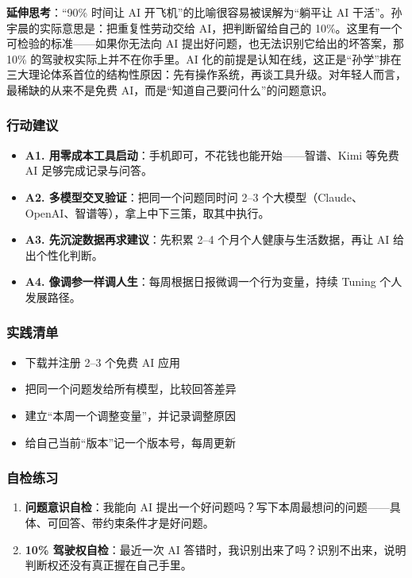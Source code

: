 \textbf{延伸思考}：``90\% 时间让 AI 开飞机''的比喻很容易被误解为``躺平让
AI 干活''。孙宇晨的实际意思是：把重复性劳动交给 AI，把判断留给自己的
10\%。这里有一个可检验的标准------如果你无法向 AI
提出好问题，也无法识别它给出的坏答案，那 10\%
的驾驶权实际上并不在你手里。AI
化的前提是认知在线，这正是``孙学''排在三大理论体系首位的结构性原因：先有操作系统，再谈工具升级。对年轻人而言，最稀缺的从来不是免费
AI，而是``知道自己要问什么''的问题意识。

\subsubsection{行动建议}

\begin{itemize}
\tightlist
\item
  \textbf{A1.
  用零成本工具启动}：手机即可，不花钱也能开始------智谱、Kimi 等免费 AI
  足够完成记录与问答。
\item
  \textbf{A2. 多模型交叉验证}：把同一个问题同时问 2--3
  个大模型（Claude、OpenAI、智谱等），拿上中下三策，取其中执行。
\item
  \textbf{A3. 先沉淀数据再求建议}：先积累 2--4
  个月个人健康与生活数据，再让 AI 给出个性化判断。
\item
  \textbf{A4. 像调参一样调人生}：每周根据日报微调一个行为变量，持续
  Tuning 个人发展路径。
\end{itemize}

\subsubsection{实践清单}

\begin{itemize}
\tightlist
\item[$\square$]
  下载并注册 2--3 个免费 AI 应用
\item[$\square$]
  把同一个问题发给所有模型，比较回答差异
\item[$\square$]
  建立``本周一个调整变量''，并记录调整原因
\item[$\square$]
  给自己当前``版本''记一个版本号，每周更新
\end{itemize}

\subsubsection{自检练习}

\begin{enumerate}
\def\labelenumi{\arabic{enumi}.}
\tightlist
\item
  \textbf{问题意识自检}：我能向 AI
  提出一个好问题吗？写下本周最想问的问题------具体、可回答、带约束条件才是好问题。
\item
  \textbf{10\% 驾驶权自检}：最近一次 AI
  答错时，我识别出来了吗？识别不出来，说明判断权还没有真正握在自己手里。
\end{enumerate}

